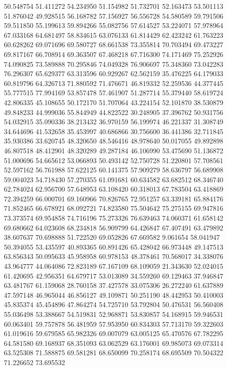 50.548754
51.411272
54.234950
51.154982
51.732701
52.163473
53.501113
51.876042
49.928515
56.168782
57.156927
56.556728
54.580589
59.791506
59.511850
55.199613
59.894266
55.082756
57.614527
53.224071
57.978964
67.033168
64.681497
58.834615
63.076133
61.814429
62.423242
61.763223
60.628262
69.071696
69.580727
68.661538
73.355814
70.703494
69.473227
69.817167
66.708914
69.363507
67.468218
67.716300
74.171469
75.252926
74.090825
73.589888
70.295846
74.049328
76.906697
75.348360
73.042283
76.296307
65.629377
63.313596
60.929267
62.562159
35.476225
64.179033
60.819796
64.326713
71.880592
71.476671
46.819332
52.259536
44.377445
55.777515
77.994169
53.857478
57.461907
51.287714
55.379440
58.619724
42.806335
45.108655
50.172170
51.707064
43.224154
52.101870
38.530879
49.848233
44.999036
55.844949
44.822522
30.248905
37.396762
50.931756
54.032915
35.090336
38.213432
36.970159
56.199974
46.221337
31.308749
34.644696
41.532658
35.453997
40.686866
30.756600
36.441386
32.711845
35.930386
33.620745
48.320650
48.546416
48.978640
50.017055
49.892898
46.807518
48.412901
48.320289
49.287184
46.106990
53.475690
51.136872
51.000696
54.665612
53.066893
50.493142
52.750728
51.220801
57.708561
52.597162
56.761988
57.622125
60.141375
57.909279
58.636797
56.689908
59.004023
54.718430
57.270355
61.091681
60.634582
63.682512
68.346740
62.784024
62.956700
57.648953
63.108420
60.318013
67.783504
63.418869
72.394259
66.000701
69.160966
70.826765
72.951257
63.339181
65.884176
71.852465
66.678921
68.092721
74.823580
75.504642
75.275155
69.947816
73.373574
69.954858
74.716196
75.273326
76.639463
74.060371
61.658142
69.680662
64.023608
68.234818
56.909799
64.426847
67.407491
63.479892
38.607637
70.698888
51.722520
69.052826
67.669582
9.061654
58.041947
50.394055
53.435597
40.893365
60.891426
65.428042
66.973448
49.147513
63.856343
50.095633
45.958958
60.978153
48.378461
70.568017
34.338076
43.964777
44.064086
72.823189
67.167109
68.109059
21.343630
52.024015
61.420695
42.956351
64.679717
53.013089
34.559260
69.129463
37.946847
63.481767
61.159068
28.760158
37.427578
33.075306
26.272240
61.637889
47.597148
46.965044
46.856127
49.109871
50.251190
48.442953
50.410003
45.835374
45.454896
47.864274
54.725710
53.792804
50.476531
56.560408
55.036498
53.388667
54.519831
52.968871
53.830857
54.168915
59.946531
60.063401
59.757878
56.481959
57.953950
60.834303
57.713170
59.322603
61.019616
59.679585
65.982326
69.007079
63.005125
65.470576
67.782295
64.581580
69.168937
68.351093
63.062529
63.176001
69.985073
69.073314
63.525308
71.588875
69.581281
68.650099
70.258174
68.695509
70.504322
71.226652
73.695532
